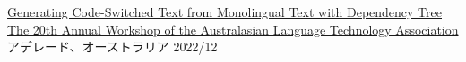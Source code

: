 

\begin{cventries}

  \cventry
    {\href{https://aclanthology.org/2022.alta-1.12/}{Generating Code-Switched Text from Monolingual Text with Dependency Tree}} %
    {\href{https://alta2022.alta.asn.au/}{The 20th Annual Workshop of the Australasian Language Technology Association}} %
    {アデレード、オーストラリア} %
    {2022/12} %
    {}

\end{cventries}
